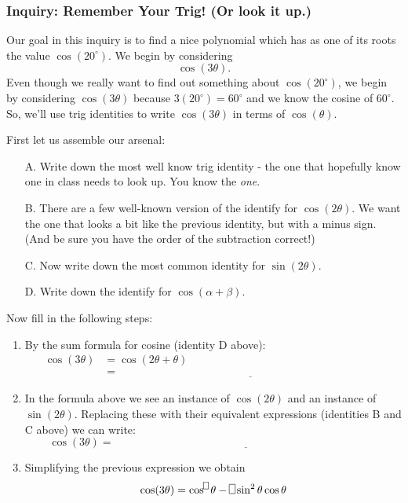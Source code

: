 \documentclass[11pt]{article}
\newenvironment{task}
	{\begin{mdframed}[linecolor=lightgray, linewidth=3pt]\raggedright}
	{\end{mdframed}}
\theoremstyle{definition}
\begin{document}
\subsubsection{Inquiry: Remember Your Trig! (Or look it up.)}
\begin{task}
  Our goal in this inquiry is to find a nice polynomial which has as one of its roots the value $\cos(20^\circ)$. We begin by considering
  \[ \cos(3\theta).\]
  Even though we really want to find out something about $\cos(20^\circ)$, we begin by considering $\cos(3\theta)$ because $3(20^\circ)=60^\circ$ and we
  know the cosine of $60^\circ$. So, we'll use trig identities to write $\cos(3\theta)$ in terms of $\cos(\theta)$.

  First let us assemble our arsenal:
      \begin{enumerate}
        \item[A.] Write down the most well know trig identity - the one that hopefully know one in class needs to look up. You know the \textit{one}.
        \item[B.] There are a few well-known version of the identify for $\cos(2\theta)$. We want the one that looks a bit like the previous identity, but
          with a minus sign. (And be sure you have the order of the subtraction correct!)
        \item[C.] Now write down the most common identity for $\sin(2\theta)$.
        \item[D.] Write down the identify for $\cos(\alpha + \beta)$.
      \end{enumerate}
  Now fill in the following steps:
  \begin{enumerate}
    \item By the sum formula for cosine (identity D above):
      \begin{align*}
       \cos(3\theta) &= \cos(2\theta + \theta)\\
                     &=\underline{\hspace{4in}}
      \end{align*}
    \item In the formula above we see an instance of $\cos(2\theta)$ and an instance of $\sin(2\theta)$. Replacing these with their equivalent
      expressions (identities B and C above) we can write:
      \[ \cos(3\theta) =\underline{\hspace{4in}} \]
    \item Simplifying the previous expression we obtain
      \[ \cos(3\theta) = \cos^{\framebox(4,6){}}\theta - \framebox(5,8){}\sin^2\theta\cos\theta\]

\end{enumerate}
\end{task}
\end{document}
